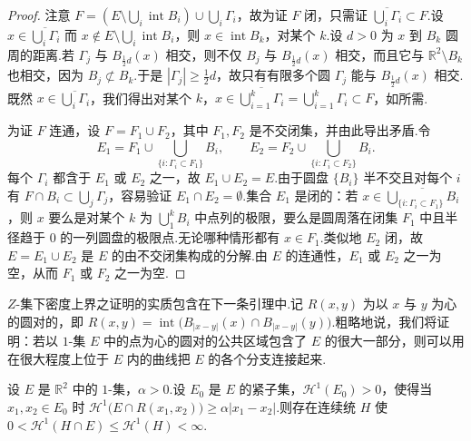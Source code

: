 \begin{proof}
注意 $F=(E\setminus\bigcup_{i}\operatorname{int}B_i)\cup\bigcup_{i}\Gamma_i$，故为证 $F$ 闭，只需证 $\overline{\bigcup_{i}\Gamma_i}\subset F$.设 $x\in\overline{\bigcup_{i}\Gamma_i}$ 而 $x\notin E\setminus\bigcup_{i}\operatorname{int}B_i$，则 $x\in\operatorname{int}B_k$，对某个 $k$.设 $d>0$ 为 $x$ 到 $B_k$ 圆周的距离.若 $\Gamma_j$ 与 $B_{\frac{1}{2}d}(x)$ 相交，则不仅 $B_j$ 与 $B_{\frac{1}{2}d}(x)$ 相交，而且它与 $\mathbb{R}^2\setminus B_k$ 也相交，因为 $B_j\not\subset B_k$.于是 $|\Gamma_j|\geq\frac{1}{2}d$，故只有有限多个圆 $\Gamma_j$ 能与 $B_{\frac{1}{2}d}(x)$ 相交.既然 $x\in\overline{\bigcup_i\Gamma_i}$，我们得出对某个 $k$，$x\in\overline{\bigcup_{i=1}^{k}\Gamma_i}=\bigcup_{i=1}^{k}\Gamma_i\subset F$，如所需.

为证 $F$ 连通，设 $F=F_1\cup F_2$，其中 $F_1,F_2$ 是不交闭集，并由此导出矛盾.令
\[
  E_1=F_1\cup\bigcup_{\{i:\Gamma_i\subset F_1\}}B_i,\qquad
  E_2=F_2\cup\bigcup_{\{i:\Gamma_i\subset F_2\}}B_i.
\]
每个 $\Gamma_i$ 都含于 $E_1$ 或 $E_2$ 之一，故 $E_1\cup E_2=E$.由于圆盘 $\{B_i\}$ 半不交且对每个 $i$ 有 $F\cap B_i\subset\bigcup_{j}\Gamma_j$，容易验证 $E_1\cap E_2=\emptyset$.集合 $E_1$ 是闭的：若 $x\in\overline{\bigcup_{\{i:\Gamma_i\subset F_1\}}B_i}$，则 $x$ 要么是对某个 $k$ 为 $\bigcup_{1}^{k}B_i$ 中点列的极限，要么是圆周落在闭集 $F_1$ 中且半径趋于 $0$ 的一列圆盘的极限点.无论哪种情形都有 $x\in F_1$.类似地 $E_2$ 闭，故 $E=E_1\cup E_2$ 是 $E$ 的由不交闭集构成的分解.由 $E$ 的连通性，$E_1$ 或 $E_2$ 之一为空，从而 $F_1$ 或 $F_2$ 之一为空.
\end{proof}

$Z$-集下密度上界之证明的实质包含在下一条引理中.记 $R(x,y)$ 为以 $x$ 与 $y$ 为心的圆对的，即 $R(x,y)=\operatorname{int}\bigl(B_{|x-y|}(x)\cap B_{|x-y|}(y)\bigr)$.粗略地说，我们将证明：若以 $1$-集 $E$ 中的点为心的圆对的公共区域包含了 $E$ 的很大一部分，则可以用在很大程度上位于 $E$ 内的曲线把 $E$ 的各个分支连接起来.

\begin{lemma}\label{lem:3.22}
设 $E$ 是 $\mathbb{R}^2$ 中的 $1$-集，$\alpha>0$.设 $E_0$ 是 $E$ 的紧子集，$\mathcal{H}^1(E_0)>0$，使得当 $x_1,x_2\in E_0$ 时 $\mathcal{H}^1\bigl(E\cap R(x_1,x_2)\bigr)\geq\alpha|x_1-x_2|$.则存在连续统 $H$ 使 $0<\mathcal{H}^1(H\cap E)\leq\mathcal{H}^1(H)<\infty$.
\end{lemma}

